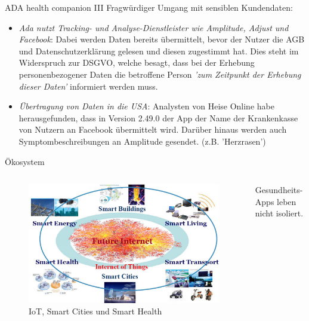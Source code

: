 \begin{frame}{ADA health companion III}
    Fragwürdiger Umgang mit sensiblen Kundendaten:
    \begin{itemize}
        \item \textit{Ada nutzt Tracking- und Analyse-Dienstleister wie Amplitude, Adjust und Facebook}: Dabei werden Daten bereits übermittelt, bevor der Nutzer die AGB und Datenschutzerklärung gelesen und diesen zugestimmt hat. Dies steht im Widerspruch zur DSGVO, welche besagt, dass bei der Erhebung personenbezogener Daten die betroffene Person \textit{'zum Zeitpunkt der Erhebung dieser Daten'} informiert werden muss. \cite{ADA6}
        \item<2-> \textit{Übertragung von Daten in die USA}: Analysten von Heise Online habe herausgefunden, dass in Version 2.49.0 der App der Name der Krankenkasse von Nutzern an Facebook übermittelt wird. Darüber hinaus werden auch Symptombeschreibungen an Amplitude gesendet. (z.B. 'Herzrasen') \cite{ADA6}
    \end{itemize}
\end{frame}

\begin{frame}{Ökosystem}
    \begin{columns}
        \begin{column}{0.5\textwidth}
            \begin{figure}
                \centering
                \includegraphics[width=\textwidth]{Bilder/Iot_apps.jpg}
                \caption{IoT, Smart Cities und Smart Health \cite{IoTapps}}
            \end{figure}
        \end{column}
        \begin{column}{0.5\textwidth}
            Gesundheits-Apps leben nicht isoliert.\\\vspace{0.5cm}
        \end{column}
    \end{columns}
\end{frame}


